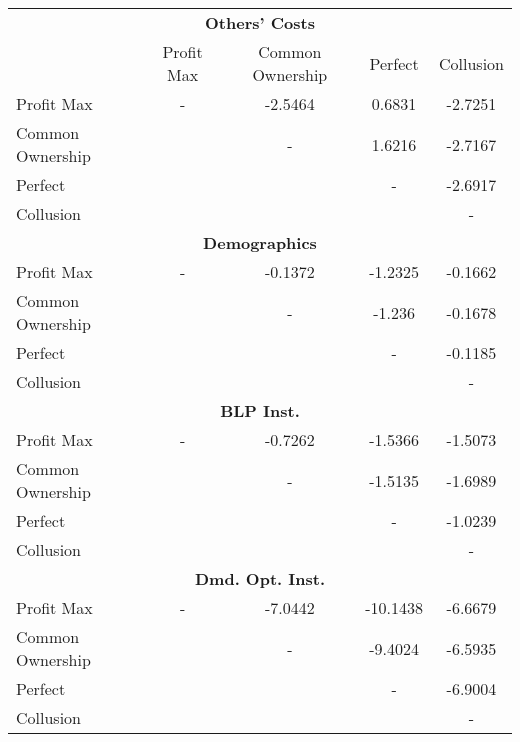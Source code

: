 \begin{tabular}{lcccc}
\toprule
                  \multicolumn{5}{c}{\textbf{Others' Costs}} \\ & Profit Max & Common Ownership & Perfect & Collusion \\
\midrule
       Profit Max &          - &          -2.5464 &  0.6831 &   -2.7251 \\
 Common Ownership &            &                - &  1.6216 &   -2.7167 \\
          Perfect &            &                  &       - &   -2.6917 \\
        Collusion &            &                  &         &         - \\
\midrule

 \multicolumn{5}{c}{\textbf{Demographics}} \\ \midrule
       Profit Max &          - &          -0.1372 & -1.2325 &   -0.1662 \\
 Common Ownership &            &                - &  -1.236 &   -0.1678 \\
          Perfect &            &                  &       - &   -0.1185 \\
        Collusion &            &                  &         &         - \\
\midrule

 \multicolumn{5}{c}{\textbf{BLP Inst.}} \\ \midrule
       Profit Max &          - &          -0.7262 & -1.5366 &   -1.5073 \\
 Common Ownership &            &                - & -1.5135 &   -1.6989 \\
          Perfect &            &                  &       - &   -1.0239 \\
        Collusion &            &                  &         &         - \\
\midrule

 \multicolumn{5}{c}{\textbf{Dmd. Opt. Inst.}} \\ \midrule
       Profit Max &          - &          -7.0442 & -10.1438 &   -6.6679 \\
 Common Ownership &            &                - &  -9.4024 &   -6.5935 \\
          Perfect &            &                  &        - &   -6.9004 \\
        Collusion &            &                  &          &         - \\
\bottomrule
\end{tabular}
 